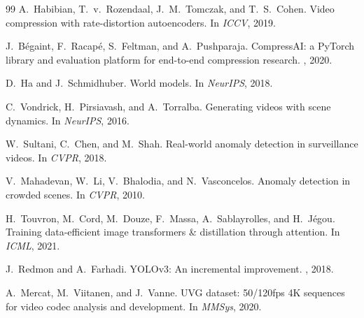\documentclass{article}
\begin{document}
\begin{thebibliography}{99}
A.~Habibian, T.~v.~Rozendaal, J.~M.~Tomczak, and T.~S.~Cohen.
\newblock Video compression with rate-distortion autoencoders.
\newblock In {\em ICCV}, 2019.

J.~B{\'e}gaint, F.~Racap{\'e}, S.~Feltman, and A.~Pushparaja.
\newblock CompressAI: a PyTorch library and evaluation platform for end-to-end compression research.
, 2020.

D.~Ha and J.~Schmidhuber.
\newblock World models.
\newblock In {\em NeurIPS}, 2018.

C.~Vondrick, H.~Pirsiavash, and A.~Torralba.
\newblock Generating videos with scene dynamics.
\newblock In {\em NeurIPS}, 2016.

W.~Sultani, C.~Chen, and M.~Shah.
\newblock Real-world anomaly detection in surveillance videos.
\newblock In {\em CVPR}, 2018.

V.~Mahadevan, W.~Li, V.~Bhalodia, and N.~Vasconcelos.
\newblock Anomaly detection in crowded scenes.
\newblock In {\em CVPR}, 2010.

H.~Touvron, M.~Cord, M.~Douze, F.~Massa, A.~Sablayrolles, and H.~J{\'e}gou.
\newblock Training data-efficient image transformers \& distillation through attention.
\newblock In {\em ICML}, 2021.

J.~Redmon and A.~Farhadi.
\newblock YOLOv3: An incremental improvement.
, 2018.

A.~Mercat, M.~Viitanen, and J.~Vanne.
\newblock UVG dataset: 50/120fps 4K sequences for video codec analysis and development.
\newblock In {\em MMSys}, 2020.

\end{thebibliography}
\end{document}
